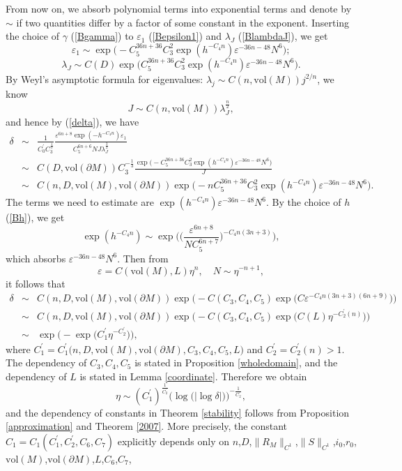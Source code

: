 \documentclass[11pt,letterpaper]{amsart}
\numberwithin{equation}{section}
\theoremstyle{definition}
\theoremstyle{plain}
\theoremstyle{definition}
\theoremstyle{plain}
\theoremstyle{definition}
\theoremstyle{plain}
\newcommand{\vol}{\textrm{vol}}
\begin{document}
From now on, we absorb polynomial terms into exponential terms and denote by $\sim$ if two quantities differ by a factor of some constant in the exponent. Inserting the choice of $\gamma$ (\ref{Bgamma}) to $\varepsilon_1$ (\ref{Bepsilon1}) and $\lambda_{J}$ (\ref{BlambdaJ}), we get
$$\varepsilon_1\sim \exp\big(-C_5^{36n+36}C_3^{2}\exp(h^{-C_4 n})\varepsilon^{-36n-48}N^6\big); $$
$$\lambda_{J}\sim C(D)\exp\big(C_5^{36n+36}C_3^{2}\exp(h^{-C_4 n})\varepsilon^{-36n-48}N^6\big).$$
By Weyl's asymptotic formula for eigenvalues: $\lambda_j\sim C(n,\vol(M))j^{2/n}$, we know
$$J\sim C(n,\vol(M))\lambda_{J}^{\frac{n}{2}},$$
and hence by (\ref{delta}), we have
\begin{eqnarray*}
\delta&\sim& \frac{1}{C_0^{\prime} C_3^{\frac{1}{3}}}\frac{\varepsilon^{6n+8} \exp(-h^{-C_4 n})\varepsilon_1}{C_5^{6n+6}NJ\lambda_{J}^{\frac{3}{2}}} \\
&\sim& C(D,\vol(\partial M)) C_3^{-\frac{1}{3}} \frac{\exp\big(- C_5^{36n+36}C_3^{2}\exp(h^{-C_4 n})\varepsilon^{-36n-48}N^6\big)}{J} \\
&\sim& C(n,D,\vol(M),\vol(\partial M))\exp\big(-n C_5^{36n+36}C_3^{2}\exp(h^{-C_4 n})\varepsilon^{-36n-48}N^6\big).
\end{eqnarray*}
The terms we need to estimate are $\exp(h^{-C_4 n})\varepsilon^{-36n-48}N^6$. By the choice of $h$ (\ref{Bh}), we get
$$\exp(h^{-C_4 n})\sim \exp\bigg(\Big(\frac{\varepsilon^{6n+8}}{NC_5^{6n+7}}\Big)^{-C_4n(3n+3)}\bigg),$$
which absorbs $\varepsilon^{-36n-48}N^6$. Then from
$$\varepsilon= C(\vol(M),L)\eta^n,\quad N\sim \eta^{-n+1},$$
it follows that
\begin{eqnarray*}
\delta &\sim& C(n,D,\vol(M),\vol(\partial M))\exp\Big(-C(C_3,C_4,C_5) \exp\big(C\varepsilon^{-C_4 n(3n+3)(6n+9)}\big)\Big) \\
&\sim& C(n,D,\vol(M),\vol(\partial M))\exp\Big(-C(C_3,C_4,C_5)\exp\big(C(L)\eta^{-C_2^{\prime}(n)}\big)\Big) \\
&\sim& \exp\Big(-\exp \big( C_1^{\prime}\eta^{-C_2^{\prime}} \big) \Big),
\end{eqnarray*}
where $C_1^{\prime}=C_1^{\prime} \big(n,D,\vol(M),\vol(\partial M),C_3,C_4,C_5,L \big)$ and $C_2^{\prime}=C_2^{\prime}(n)>1$. The dependency of $C_3,C_4,C_5$ is stated in Proposition \ref{wholedomain}, and the dependency of $L$ is stated in Lemma \ref{coordinate}. Therefore we obtain
$$\eta \sim  (C_1^{\prime})^{\frac{1}{C_2^{\prime}}}\Big( \log \big(|\log\delta| \big) \Big)^{-\frac{1}{C_2^{\prime}}},$$
and the dependency of constants in Theorem \ref{stability} follows from Proposition \ref{approximation} and Theorem \ref{2007}. More precisely, the constant $C_1=C_1(C_1^{\prime},C_2^{\prime},C_6,C_7)$ explicitly depends only on $n$,$D$,$\|R_M\|_{C^1}$,$\|S\|_{C^1}$,$i_0$,$r_0$,$\vol(M)$,$\vol(\partial M)$,$L$,$C_6$,$C_7$,
\end{document}
